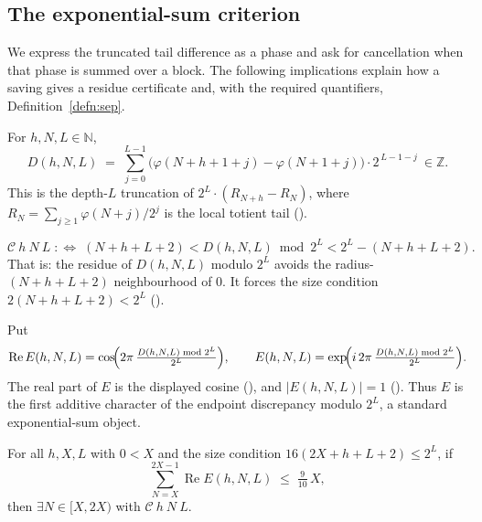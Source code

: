 \subsection{The exponential-sum criterion}
\label{ssec:headline}

We express the truncated tail difference as a phase and ask for
cancellation when that phase is summed over a block. The following
implications explain how a saving gives a residue certificate and,
with the required quantifiers, Definition~\ref{defn:sep}.

\begin{defn}
For $h,N,L\in\mathbb N$,
\[
  D(h,N,L) \;=\; \sum_{j=0}^{L-1} \bigl(\varphi(N+h+1+j) - \varphi(N+1+j)\bigr)\cdot 2^{\,L-1-j}
  \ \in \mathbb Z .
\]
This is the depth-$L$ truncation of $2^L\cdot(R_{N+h}-R_N)$, where
$R_N = \sum_{j\ge 1}\varphi(N+j)/2^j$ is the local totient tail
().
\end{defn}

\begin{defn}\label{defn:central-residue-condition}
\[
  \mathcal{C}\ h\ N\ L \;:\Leftrightarrow\;
  (N{+}h{+}L{+}2) < D(h,N,L)\bmod 2^L < 2^L - (N{+}h{+}L{+}2).
\]
That is: the residue of $D(h,N,L)$ modulo $2^L$ avoids the radius-$(N{+}h{+}L{+}2)$ neighbourhood
of $0$. It forces the size condition $2(N{+}h{+}L{+}2) < 2^L$
().
\end{defn}

\begin{defn}
Put
\[
  \operatorname{Re}E(h,N,L) = \cos\!\Bigl(2\pi\,\tfrac{D(h,N,L)\bmod 2^L}{2^L}\Bigr),\qquad
  E(h,N,L) = \exp\!\Bigl(i\,2\pi\,\tfrac{D(h,N,L)\bmod 2^L}{2^L}\Bigr).
\]
The real part of $E$ is the displayed cosine
(), and
$|E(h,N,L)| = 1$ ().
Thus $E$ is the first additive character of the endpoint discrepancy
modulo $2^L$, a standard exponential-sum object.
\end{defn}

\begin{thm}
\label{thm:hgap-real}
For all $h,X,L$ with $0<X$ and the size condition $16(2X{+}h{+}L{+}2)\le 2^L$, if
\[
  \sum_{N=X}^{2X-1} \operatorname{Re}E(h,N,L) \;\le\; \tfrac{9}{10}\,X ,
\]
then $\exists N\in[X,2X)$ with $\mathcal{C}\ h\ N\ L$.
\end{thm}

